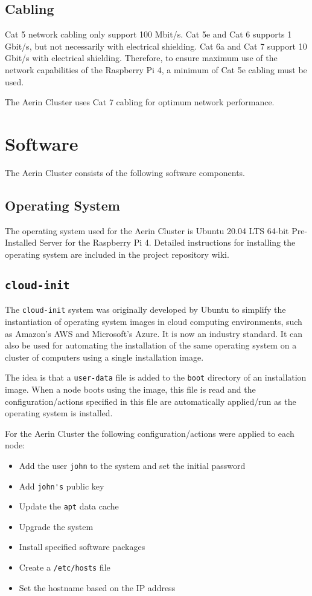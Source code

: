 %
%
\subsection{Cabling}
Cat 5 network cabling only support 100 Mbit/s. Cat 5e and Cat 6 supports 1 Gbit/s, but not necessarily with electrical shielding. Cat 6a and Cat 7 support 10 Gbit/s with electrical shielding. Therefore, to ensure maximum use of the network capabilities of the Raspberry Pi 4, a minimum of Cat 5e cabling must be used.

The Aerin Cluster uses Cat 7 cabling for optimum network performance.


%
%
\section{Software}

The Aerin Cluster consists of the following software components.


%
%
\subsection{Operating System}
The operating system used for the Aerin Cluster is Ubuntu 20.04 LTS 64-bit Pre-Installed Server for the Raspberry Pi 4. Detailed instructions for installing the operating system are included in the project repository wiki.


%
%
\subsection{\texttt{cloud-init}}

The \verb|cloud-init| system was originally developed by Ubuntu to simplify the instantiation of operating system images in cloud computing environments, such as Amazon's AWS and Microsoft's Azure. It is now an industry standard. It can also be used for automating the installation of the same operating system on a cluster of computers using a single installation image.

The idea is that a \verb|user-data| file is added to the \verb|boot| directory of an installation image. When a node boots using the image, this file is read and the configuration/actions specified in this file are automatically applied/run as the operating system is installed.

For the Aerin Cluster the following configuration/actions were applied to each node:

\begin{itemize}
\item Add the user \verb|john| to the system and set the initial password 
\item Add \verb|john's| public key
\item Update the \verb|apt| data cache
\item Upgrade the system
\item Install specified software packages
\item Create a \verb|/etc/hosts| file
\item Set the hostname based on the IP address
\end{itemize}

